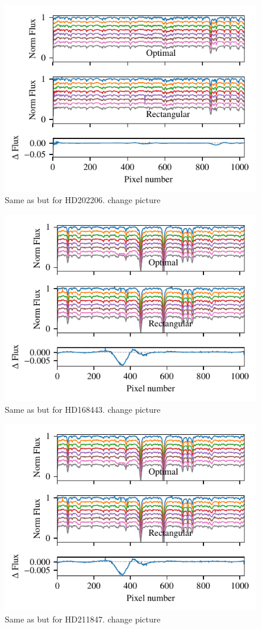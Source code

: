  \begin{figure}
     \centering
     \includegraphics[width=0.7\linewidth]{figures/reduction/bp_plots/extraction_comparision_HD4747-1_chip_4}
     \caption{Same as  but for HD202206. {\red change picture}}
     \label{fig:artifact_example4}
 \end{figure}
 \begin{figure}
     \centering
     \includegraphics[width=0.7\linewidth]{figures/reduction/bp_plots/extraction_comparision_HD30501-1_chip_1}
     \caption{Same as  but for HD168443. {\red change picture}}
     \label{fig:artifact_example5}
 \end{figure}
  \begin{figure}
     \centering
     \includegraphics[width=0.7\linewidth]{figures/reduction/bp_plots/extraction_comparision_HD30501-1_chip_1}
     \caption{Same as  but for HD211847. {\red change picture}}
     \label{fig:artifact_example6}
 \end{figure}
